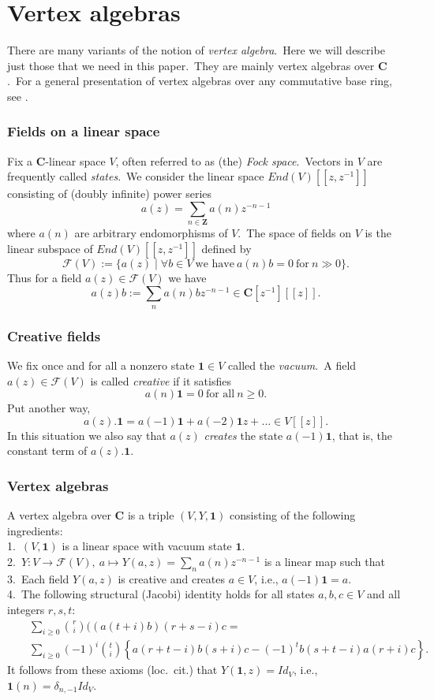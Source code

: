\documentclass[12pt]{amsart}
\theoremstyle{plain}
\theoremstyle{definition}
\theoremstyle{remark}
\newcommand{\CC}{\mathbf{C}}
\newcommand{\ZZ}{\mathbf{Z}}
\begin{document}
\section{Vertex algebras}\label{AppB}
There are many variants of the notion of \textit{vertex algebra}.\ Here we will describe just those that we need in this paper.\ They are mainly vertex algebras over $\CC$.\ For a general presentation of vertex algebras over any commutative base ring, see \cite{Mason1}.

\subsubsection{Fields on a linear space}
Fix a $\CC$-linear space $V$, often referred to as (the) \textit{Fock space}.\ Vectors in $V$ are frequently called \textit{states}.\ We consider the linear space $End(V)[[z, z^{-1}]]$ consisting of (doubly infinite)
power series 
$$a(z)=\sum_{n\in \ZZ} a(n)z^{-n-1}$$
where $a(n)$ are arbitrary endomorphisms  of $V$.\ The space of fields on $V$ is the linear subspace of $End(V)[[z, z^{-1}]]$ defined by
$$\mathcal{F}(V):= \{a(z) \mid \forall b\in V\ \mbox{we have}\  a(n)b=0\ \mbox{for}\ n\gg0\}.$$
Thus for a field $a(z)\in \mathcal{F}(V)$ we have
$$ a(z)b :=\sum_n a(n)bz^{-n-1}\in \CC[z^{-1}][[z]].$$

\subsubsection{Creative fields}
We fix once and for all a nonzero state $\mathbf{1}\in V$ called the \textit{vacuum}.\ A field $a(z)\in\mathcal{F}(V)$ is called \textit{creative} if it satisfies
$$a(n)\mathbf{1}=0\ \mbox{for all}\ n\geq 0.$$
Put another way,
$$a(z).\mathbf{1}= a(-1)\mathbf{1}+a(-2)\mathbf{1}z+\hdots \in V[[z]].$$
In this situation we also say that $a(z)$ \textit{creates} the state $a(-1)\mathbf{1}$, that is, the constant term of $a(z).\mathbf{1}$.

\subsubsection{Vertex algebras}
A vertex algebra over $\CC$ is a triple $(V, Y, \mathbf{1})$ consisting of the following ingredients:\\
1.\   $(V, \mathbf{1})$ is a linear space with vacuum state $\mathbf{1}$.\\
2.\  $Y: V\rightarrow \mathcal{F}(V),\ a\mapsto Y(a, z)=\sum_n a(n)z^{-n-1}$ is a linear map such that\\
3.\ Each field $Y(a, z)$ is creative and creates $a\in V$, i.e., $a(-1)\mathbf{1}=a$.\\
4.\ The following structural (Jacobi)  identity holds for all states $a, b, c\in V$ and all integers $r, s, t$:
\begin{eqnarray*}
&&\sum_{i\geq0}\binom{r}{i} ((a(t+i)b)(r+s-i)c= \\
&&\sum_{i\geq0}(-1)^i \binom{t}{i} \left\{ a(r+t-i)b(s+i)c-(-1)^tb(s+t-i)a(r+i)c  \right\} .
\end{eqnarray*}
It follows from these axioms (loc.\ cit.) that $Y(\mathbf{1}, z)=Id_V$, i.e., $\mathbf{1}(n)=\delta_{n, -1}Id_V$.\ 
\end{document}
